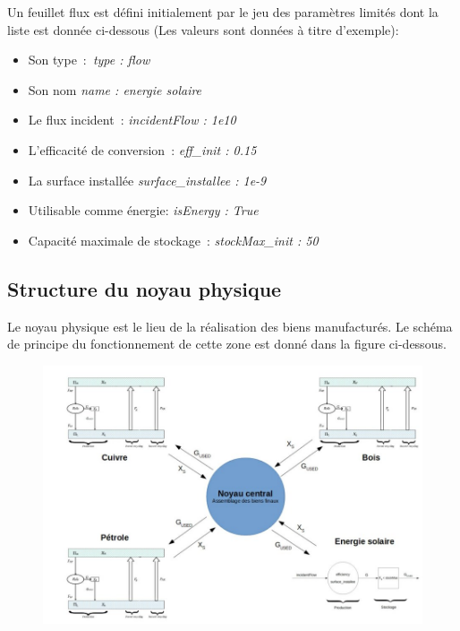 \documentclass[12pt,a4paper]{article}%
\begin{document}
Un feuillet flux est défini initialement par le jeu des paramètres limités
dont la liste est donnée ci-dessous (Les valeurs sont données à titre d'exemple):

\begin{itemize}
\item Son type~:\textit{\ type : flow}

\item Son nom \textit{name : energie solaire}

\item Le flux incident~: \textit{incidentFlow : 1e10}

\item L'efficacité de conversion~: \textit{eff\_init : 0.15}

\item La surface installée \textit{surface\_installee : 1e-9}

\item Utilisable comme énergie: \textit{isEnergy : True }

\item Capacité maximale de stockage~: \textit{stockMax\_init : 50}
\end{itemize}

\subsection{Structure du noyau physique}

Le noyau physique est le lieu de la réalisation des biens manufacturés. Le
schéma de principe du fonctionnement de cette zone est donné dans la figure ci-dessous.

\begin{figure}[h]
\centering \includegraphics[width=1.0\textwidth]{figures/NoyauCentral.jpg}\end{figure}
\end{document}
